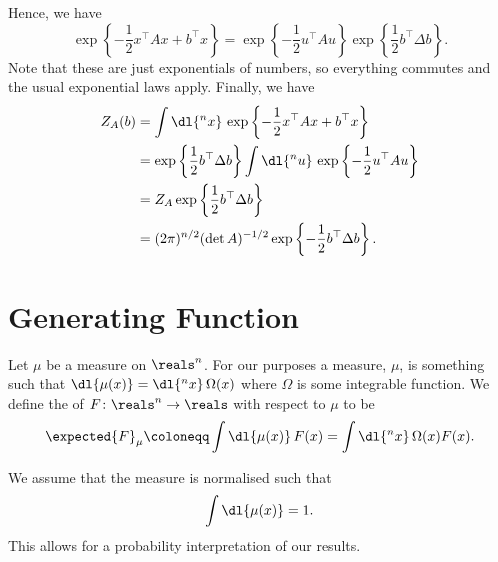 \documentclass[fleqn]{NotesClass}
\newcommand{\trans}{{\top}}
\begin{document}
    Hence, we have
    \begin{equation}
        \exp\left\{ -\frac{1}{2}x^\trans A x + b^\trans x \right\} = \exp\left\{-\frac{1}{2} u^\trans A u\right\} \exp\left\{ \frac{1}{2} b^\trans \Delta b \right\}.
    \end{equation}
    Note that these are just exponentials of numbers, so everything commutes and the usual exponential laws apply.
    Finally, we have
    \begin{align}
        Z_A(b) &= \int \dl{^nx} \, \exp\left\{ -\frac{1}{2}x^\trans A x + b^\trans x \right\}\\
        &= \exp\left\{ \frac{1}{2}b^\trans \Delta b \right\} \int \dl{^nu} \, \exp\left\{ -\frac{1}{2}u^\trans A u \right\}\\
        &= Z_A\exp\left\{ \frac{1}{2}b^\trans \Delta b \right\}\\
        &= (2\pi)^{n/2} (\det A)^{-1/2} \exp\left\{ -\frac{1}{2}b^\trans \Delta b \right\}.
    \end{align}
    
    \section{Generating Function}
    Let \(\mu\) be a measure on \(\reals^n\).
    For our purposes a measure, \(\mu\), is something such that \(\dl{\mu(x)} = \dl{^nx}\, \Omega(x)\) where \(\Omega\) is some integrable function.
    We define the  of \(F \colon \reals^n \to \reals\) with respect to \(\mu\) to be
    \begin{equation}
        \expected{F}_\mu \coloneqq \int \dl{\mu(x)} \, F(x) = \int \dl{^nx} \, \Omega(x) F(x).
    \end{equation}
    
    We assume that the measure is normalised such that
    \begin{equation}
        \int \dl{\mu(x)} = 1.
    \end{equation}
    This allows for a probability interpretation of our results.
    
\end{document}
